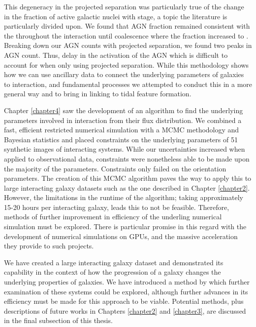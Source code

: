 This degeneracy in the projected separation was particularly true of the change in the fraction of active galactic nuclei with stage, a topic the literature is particularly divided upon. We found that AGN fraction remained consistent with the \DIFdelbegin {}\DIFdelend \DIFaddbegin {}\DIFaddend throughout the interaction \DIFdelbegin \DIFdel{, }\DIFdelend until coalescence where the fraction increased to \DIFdelbegin {}\DIFdelend \DIFaddbegin {}\DIFaddend . Breaking down our AGN counts with projected separation, we found two peaks in AGN count. Thus, \DIFdelbegin {}\DIFdelend \DIFaddbegin {}\DIFaddend delay in the activation of the AGN which is difficult to account for when only using projected separation. While this methodology shows how we can use ancillary data to connect the underlying parameters of galaxies to interaction, and fundamental processes we attempted to conduct this in a more general way and to bring in linking to tidal feature formation. 

Chapter \ref{chapter4} saw the development of an algorithm to find the underlying parameters \DIFdelbegin {}\DIFdelend \DIFaddbegin {}\DIFaddend involved in interaction \DIFdelbegin {}\DIFdelend from their flux distribution. We combined a fast, efficient restricted numerical simulation with a MCMC methodology and Bayesian statistics and placed constraints on the underlying parameters of 51 synthetic images of interacting systems. While our uncertainties increased when applied to observational data, constraints were nonetheless able to be made upon the majority of the parameters. Constraints only failed on the orientation parameters. The creation of this MCMC algorithm paves the way to apply this to large interacting galaxy datasets such as the one described in Chapter \ref{chapter2}. However, the limitations in the runtime of the algorithm; taking approximately 15-20 hours per interacting galaxy, leads this to not be feasible. Therefore, methods of further improvement in efficiency of the underling numerical simulation must be explored. There is particular promise in this regard with the development of numerical simulations on GPUs, and the massive acceleration they provide to such projects.

We have created a large interacting galaxy dataset and demonstrated its capability in the context of how the progression of a galaxy changes the underlying properties of galaxies. We have introduced a method by which further examination of these systems could be explored, although further advances in its efficiency must be made for this approach to be viable. Potential methods, plus descriptions of future works in Chapters \ref{chapter2} and \ref{chapter3}, are discussed in the final subsection of this thesis.

